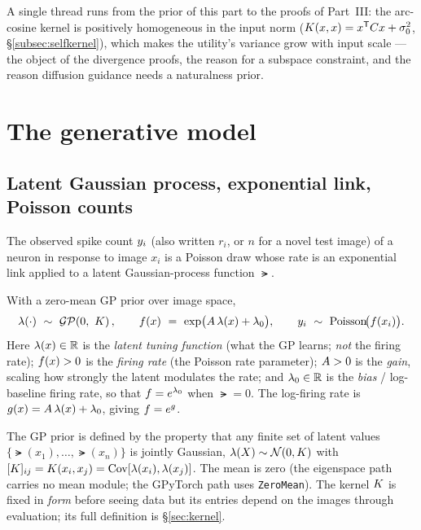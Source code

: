 A single thread runs from the prior of this part to the proofs of Part~III: the
arc-cosine kernel is positively homogeneous in the input norm
($K(x,x)=x^{\mathsf{T}}C x+\sigma_{0}^2$, \S\ref{subsec:selfkernel}), which makes the
utility's variance grow with input scale --- the object of the divergence proofs,
the reason for a subspace constraint, and the reason diffusion guidance needs a
naturalness prior.


\section{The generative model}
\label{sec:genmodel}

\subsection{Latent Gaussian process, exponential link, Poisson counts}

The observed spike count $y_i$ (also written $r_i$, or $n$ for a novel test
image) of a neuron in response to image $x_i$ is a Poisson draw whose rate is an
exponential link applied to a latent Gaussian-process function $\lat$.

\begin{definition}
\label{eq:genmodel}
With a zero-mean GP prior over image space,
\begin{equation}
\lat(\cdot)\ \sim\ \GProc\!\left(0,\ \Kf\right),
\qquad
\rate(x)\ =\ \exp\!\big(\gain\,\lat(x)+\latz\big),
\qquad
\spk_i\ \sim\ \Poi\!\big(\rate(x_i)\big).
\end{equation}
Here $\lambda(x)\in\mathbb{R}$ is the \emph{latent tuning function} (what the GP learns;
\emph{not} the firing rate); $f(x)>0$ is the \emph{firing rate} (the Poisson
rate parameter); $A>0$ is the \emph{gain}, scaling how strongly the latent
modulates the rate; and $\lambda_{0}\in\mathbb{R}$ is the \emph{bias} / log-baseline
firing rate, so that $f=e^{\lambda_{0}}$ when $\lat=0$. The log-firing rate is
$g(x)=A\,\lambda(x)+\lambda_{0}$, giving $f=e^{g}$.
\end{definition}

The GP prior is defined by the property that any finite set of latent values
$\{\lat(x_1),\dots,\lat(x_n)\}$ is jointly Gaussian, $\lambda(X)\sim\mathcal{N}(0,K)$
with $[K]_{ij}=K(x_i,x_j)=\mathrm{Cov}[\lambda(x_i),\lambda(x_j)]$. The mean is zero
(the eigenspace path carries no mean module; the GPyTorch path uses
\texttt{ZeroMean}). The kernel $K$ is fixed in \emph{form} before seeing data but
its entries depend on the images through evaluation; its full definition is
\S\ref{sec:kernel}.

